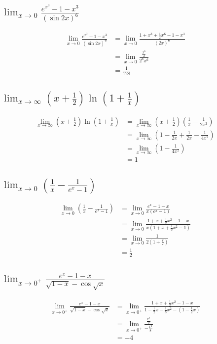 \documentclass{article}
\begin{document}

    \subsection*{$\lim_{x \to 0}\frac{e^{x^3} - 1 - x^3}{(\sin 2x)^6}$}

    $$\begin{aligned}
        \lim_{x \to 0}\frac{e^{x^3} - 1 - x^3}{(\sin 2x)^6} &= \lim_{x \to 0}\frac{1 + x^3 + \frac 1 2 x^6 - 1 - x^3}{(2x)^6} \\
        &= \lim_{x \to 0}\frac{\frac{x^6}{2}}{2^6 x^6} \\
        &= \frac{1}{128}
    \end{aligned}$$

    \subsection*{$\lim_{x \to \infty}(x + \frac 1 2)\ln(1 + \frac 1 x)$}

    $$\begin{aligned}
        \lim_{x \to \infty}(x + \frac 1 2)\ln(1 + \frac 1 x) &= \lim_{x \to \infty}(x + \frac 1 2)(\frac 1 x - \frac{1}{2x^2}) \\
        &= \lim_{x \to \infty}(1 - \frac{1}{2x} + \frac{1}{2x} - \frac{1}{4x^2}) \\
        &= \lim_{x \to \infty}(1 - \frac{1}{4x^2}) \\
        &= 1
    \end{aligned}$$

    \subsection*{$\lim_{x \to 0}(\frac 1 x - \frac{1}{e^x - 1})$}

    $$\begin{aligned}
        \lim_{x \to 0}(\frac 1 x - \frac{1}{e^x - 1}) &= \lim_{x \to 0}\frac{e^x - 1 - x}{x(e^x - 1)} \\
        &= \lim_{x \to 0}\frac{1 + x + \frac 1 2 x^2 - 1 - x}{x(1 + x + \frac 1 2 x^2 - 1)} \\
        &= \lim_{x \to 0}\frac{1}{2(1 + \frac x 2)} \\
        &= \frac{1}{2}
    \end{aligned}$$

    \subsection*{$\lim_{x \to 0^+}\frac{e^x - 1 - x}{\sqrt{1 - x} - \cos \sqrt x}$}

    $$\begin{aligned}
        \lim_{x \to 0^+}\frac{e^x - 1 - x}{\sqrt{1 - x} - \cos \sqrt{x}} &= \lim_{x \to 0^+}\frac{1 + x + \frac 1 2 x^2 - 1 - x}{1 - \frac 1 2 x - \frac 1 8 x^2 - (1 - \frac 1 2 x)} \\
        &= \lim_{x \to 0^+}\frac{\frac{x^2}{2}}{-\frac{x^2}{8}} \\
        &= -4
    \end{aligned}$$
\end{document}
